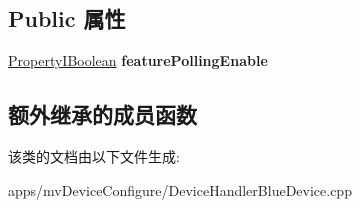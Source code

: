 \subsection*{Public 属性}
\begin{DoxyCompactItemize}
\item 
\hypertarget{class_system_settings_gen_t_l_a0dbfe0dfd3a70af52c7ed37e8a912310}{\hyperlink{group___common_interface_ga44f9437e24b21b6c93da9039ec6786aa}{Property\+I\+Boolean} {\bfseries feature\+Polling\+Enable}}\label{class_system_settings_gen_t_l_a0dbfe0dfd3a70af52c7ed37e8a912310}

\end{DoxyCompactItemize}
\subsection*{额外继承的成员函数}


该类的文档由以下文件生成\+:\begin{DoxyCompactItemize}
\item 
apps/mv\+Device\+Configure/Device\+Handler\+Blue\+Device.\+cpp\end{DoxyCompactItemize}
